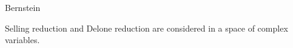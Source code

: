 \documentclass[preprint]{iucr}              %
\numberwithin{equation}{section}
\newcommand{\CIII}[0]{$\bf{C^{3}}$}
\begin{document}
	
	\author[b]{Herbert J.}{Bernstein}
	
	
	
	
	
	
	
	
	
	\maketitle                        %
	
	\begin{synopsis}
		Selling reduction and Delone reduction are
		considered in a space of complex variables.
	\end{synopsis}
	\newcommand{\si}[0]{$s_1$}
	\newcommand{\sii}[0]{$s_2$}
	\newcommand{\siii}[0]{$s_3$}
	\newcommand{\siv}[0]{$s_4$}
	\newcommand{\sv}[0]{$s_5$}
	\newcommand{\svi}[0]{$s_6$}
	\newcommand{\Svec} [0] {\{\si, \sii, \siii, \siv, \sv, \svi \}}
	\newcommand{\SvecA} [0] {\{-\si, -\si+\sii, \si+\siii, \si+\sv, \si+\siv, \si+\svi \}}
	
	\newcommand{\OPES}[0]{$E^3toS^6$}
	\newcommand{\OPESS}[0]{$$E^3toS^6$$}
	\newcommand{\MSVI}[0]{$M_{S^{6}}$}
	\newcommand{\MEIII}[0]{$M_{E^{3}}$}
	\newcommand{\Plus}[0]{$\textfrak{P}$}	
	\newcommand{\Minus}[0]{$\textfrak{M}$}
	
\end{document}
